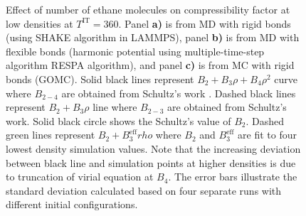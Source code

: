 \documentclass[5p,times]{elsarticle}
\begin{document}
\begin{figure}
\caption{ Effect of number of ethane molecules on compressibility factor at low densities at $T^{\mathrm{IT}}=360$. Panel \textbf{a)} is from MD with rigid bonds (using SHAKE algorithm in LAMMPS), panel \textbf{b)} is from MD with flexible bonds (harmonic potential using multiple-time-step algorithm RESPA \cite{tuckerman1992} algorithm), and panel \textbf{c)} is from MC with rigid bonds (GOMC). 
Solid black lines represent $B_2+B_3 \rho+B_4 \rho^2$ curve where $B_{2-4}$ are obtained from Schultz's work \cite{Schultz2010a}. Dashed black lines represent $B_2+B_3 \rho$ line where $B_{2-3}$ are obtained from Schultz's work. Solid black circle shows the Schultz's value of $B_2$. Dashed green lines represent $B_2+B_3^\mathrm{eff}rho$ where $B_2$ and $B_3^\mathrm{eff}$ are fit to four lowest density simulation values. Note that the increasing  deviation between black line and simulation points at higher densities is due to truncation of virial equation at $B_4$. The error bars illustrate the standard deviation calculated based on four separate runs with different initial configurations.
}
\label{fig:FSE_TraPPE_C2_abc}
\end{figure}
\end{document}
